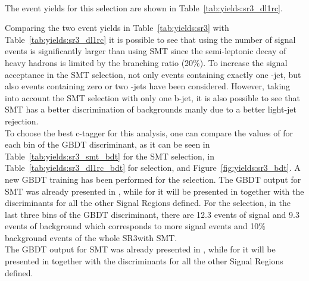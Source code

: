 \\The event yields for this selection are shown in Table~\ref{tab:yields:sr3_dl1rc}.
\begin{table}[!h]
	\centering
	\small
	
	\caption{Total event yields for the SR3\tZc selection using the \Pqc-tagger \DLrc.}
\label{tab:yields:sr3_dl1rc}
\end{table}  
\newline \noindent Comparing the two event yields in Table~\ref{tab:yields:sr3} with Table~\ref{tab:yields:sr3_dl1rc} it is possible to see that using \DLrc the number of signal events is significantly larger than using SMT since the semi-leptonic decay of heavy hadrons is limited by the branching ratio (20\%). 
To increase the signal acceptance in the SMT selection, not only events containing exactly one \Pqb-jet, but also events containing zero or two \Pqb-jets have been considered.
However, taking into account the SMT selection with only one b-jet, it is also possible to see that SMT has a better discrimination of backgrounds manly due to a better light-jet rejection.\\
To choose the best c-tagger for this analysis, one can compare the values of \ssplusb for each bin of the GBDT discriminant, as it can be seen in Table~\ref{tab:yields:sr3_smt_bdt} for the SMT selection, in Table~\ref{tab:yields:sr3_dl1rc_bdt} for \DLrc selection, and Figure~\ref{fig:yields:sr3_bdt}. A new GBDT training has been performed for the \DLrc selection. The GBDT output for SMT was already presented in , while for \DLrc it will be presented in  together with the discriminants for all the other Signal Regions defined.
For the \DLrc selection, in the last three bins of the GBDT discriminant, there are
12.3 events of signal and 9.3 events of background 
which corresponds to more signal events and 10\% background events of the whole SR3\tZc with SMT.\\
The GBDT output for SMT was already presented in , while for \DLrc it will be presented in  together with the discriminants for all the other Signal Regions defined.

